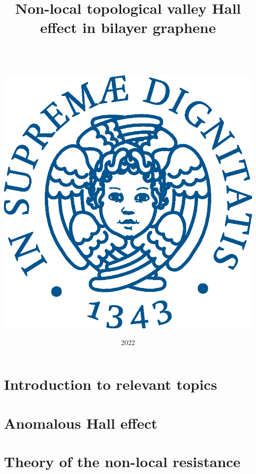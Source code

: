 \documentclass[11pt,a4paper]{report}
\date{{\LARGE 2022}}
\title{{\myfont Non-local topological valley Hall effect in bilayer graphene}}
\author{{\Huge }\\ \\ \\
		\includegraphics[scale=0.6]{Immagini/cherubino.eps}\\}
\theoremstyle{definition}
\theoremstyle{plain}
\theoremstyle{plain}
\begin{document}
	\maketitle
	\tableofcontents
	
	
	\chapter{Introduction to relevant topics}
	
	
	
	
	
	

	\chapter{Anomalous Hall effect}
	
	

	\chapter{Theory of the non-local resistance}
	
	
	

	
	
	
	\printbibliography
\end{document}
